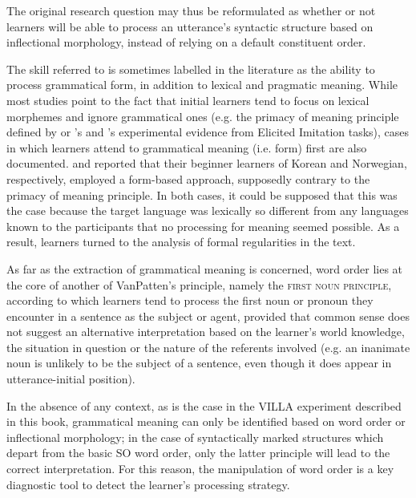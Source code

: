 The original research question may thus be reformulated as whether or not learners will be able to process an utterance’s syntactic structure based on inflectional morphology, instead of relying on a default constituent order. 

The skill referred to is sometimes labelled in the literature as the ability to process grammatical form, in addition to lexical and pragmatic meaning. While most studies point to the fact that initial learners tend to focus on lexical morphemes and ignore grammatical ones (e.g. the primacy of meaning principle defined by \citet{VanPatten1996} or \citeauthor{Klein1986}'s \citeyear{Klein1986} and \citeauthor{Rast2008}'s \citeyear{Rast2008} experimental evidence from Elicited Imitation tasks), cases in which learners attend to grammatical meaning (i.e. form) first are also documented. \citet{Park2013} and \citet{HanPeverly2007} reported that their beginner learners of Korean and Norwegian, respectively, employed a form-based approach, supposedly contrary to the primacy of meaning principle. In both cases, it could be supposed that this was the case because the target language was lexically so different from any languages known to the participants that no processing for meaning seemed possible. As a result, learners turned to the analysis of formal regularities in the text.

As far as the extraction of grammatical meaning is concerned, word order lies at the core of another of VanPatten’s principle, namely the \textsc{first} \textsc{noun} \textsc{principle}, according to which learners tend to process the first noun or pronoun they encounter in a sentence as the subject or agent, provided that common sense does not suggest an alternative interpretation based on the learner’s world knowledge, the situation in question or the nature of the referents involved (e.g. an inanimate noun is unlikely to be the subject of a sentence, even though it does appear in utterance-initial position). 

In the absence of any context, as is the case in the VILLA experiment described in this book, grammatical meaning can only be identified based on word order or inflectional morphology; in the case of syntactically marked structures which depart from the basic SO word order, only the latter principle will lead to the correct interpretation. For this reason, the manipulation of word order is a key diagnostic tool to detect the learner's processing strategy.

